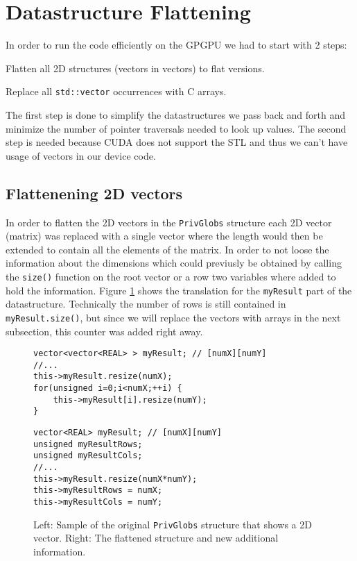 \section{Datastructure Flattening}

In order to run the code efficiently on the GPGPU we had to start with 2 steps:
\begin{enumerate*}
	\item Flatten all 2D structures (vectors in vectors) to flat versions.
    \item Replace all \texttt{std::vector} occurrences with C arrays.
\end{enumerate*}

The first step is done to simplify the datastructures we pass back and forth
and minimize the number of pointer traversals needed to look up values. The
second step is needed because CUDA does not support the STL and thus we can't
have usage of vectors in our device code. 

\subsection{Flattenening 2D vectors}

In order to flatten the 2D vectors in the \texttt{PrivGlobs} structure each
2D vector (matrix) was replaced with a single vector where the length would then
be extended to contain all the elements of the matrix. In order to not loose
the information about the dimensions which could previusly be obtained by
calling the \texttt{size()} function on the root vector or a row two variables
where added to hold the information. Figure \ref{code:privglobsflatten} shows
the translation for the \texttt{myResult} part of the datastructure. Technically
the number of rows is still contained in \texttt{myResult.size()}, but since we
will replace the vectors with arrays in the next subsection, this counter was
added right away.

\begin{figure}[H]
\begin{minipage}{.45\textwidth}
\begin{lstlisting}
vector<vector<REAL> > myResult; // [numX][numY]
//...
this->myResult.resize(numX);
for(unsigned i=0;i<numX;++i) {
    this->myResult[i].resize(numY);
}
\end{lstlisting}
\end{minipage}\hfill
\begin{minipage}{.45\textwidth}
\begin{lstlisting}
vector<REAL> myResult; // [numX][numY]
unsigned myResultRows;
unsigned myResultCols;
//...
this->myResult.resize(numX*numY);
this->myResultRows = numX;
this->myResultCols = numY;
\end{lstlisting}
\end{minipage}
\caption{Left: Sample of the original \texttt{PrivGlobs} structure that shows a
2D vector. Right: The flattened structure and new additional information.}
\label{code:privglobsflatten}
\end{figure}

